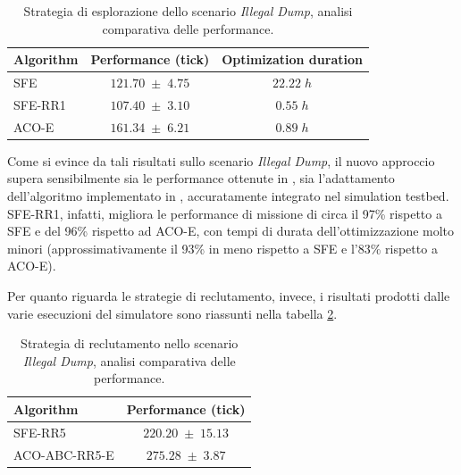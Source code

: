 \begin{table}[H]
    \centering
    \captionsetup{justification=centering, margin=2cm, font=footnotesize}
    \begin{tabular}{|l|c|c|}
    \hline
    \textbf{Algorithm}              & \textbf{Performance (tick)}       & \textbf{Optimization duration}      \\ \hline
    SFE                             & $121.70 \; \pm \; 4.75$           & $22.22 \; h$                                      \\ \hline
    SFE-RR1                         & $107.40 \; \pm \; 3.10$           & $0.55 \; h$                                       \\ \hline
    ACO-E                           & $161.34 \; \pm \; 6.21$           & $0.89 \; h$                                     \\ \hline
    \end{tabular}%
    
    \caption{Strategia di esplorazione dello scenario \textit{Illegal Dump}, analisi comparativa delle performance.}
    \label{analisi_comparativa_esplorazione_dump}
\end{table}

Come si evince da tali risultati sullo scenario \textit{Illegal Dump}, il nuovo approccio supera sensibilmente sia le performance ottenute in \cite{cimino2019adaptive}, sia l'adattamento dell'algoritmo implementato in \cite{palmieri2017comparison}, accuratamente integrato nel simulation testbed.
SFE-RR1, infatti, migliora le performance di missione di circa il 97\% rispetto a SFE e del 96\% rispetto ad ACO-E, con tempi di durata dell'ottimizzazione molto minori (approssimativamente il 93\% in meno rispetto a SFE e l'83\% rispetto a ACO-E).

Per quanto riguarda le strategie di reclutamento, invece, i risultati prodotti dalle varie esecuzioni del simulatore sono riassunti nella tabella \ref{analisi_comparativa_reclutamento_dump}.

\begin{table}[H]
    \centering
    \captionsetup{justification=centering, margin=2cm, font=footnotesize}
    \begin{tabular}{|l|c|}
    \hline
    \textbf{Algorithm}              & \textbf{Performance (tick)}       \\ \hline
    SFE-RR5                         & $220.20 \; \pm \; 15.13$           \\ \hline
    ACO-ABC-RR5-E                   & $275.28 \; \pm \; 3.87$           \\ \hline
    \end{tabular}%
    
    \caption{Strategia di reclutamento nello scenario \textit{Illegal Dump}, analisi comparativa delle performance.}
    \label{analisi_comparativa_reclutamento_dump}
\end{table}

